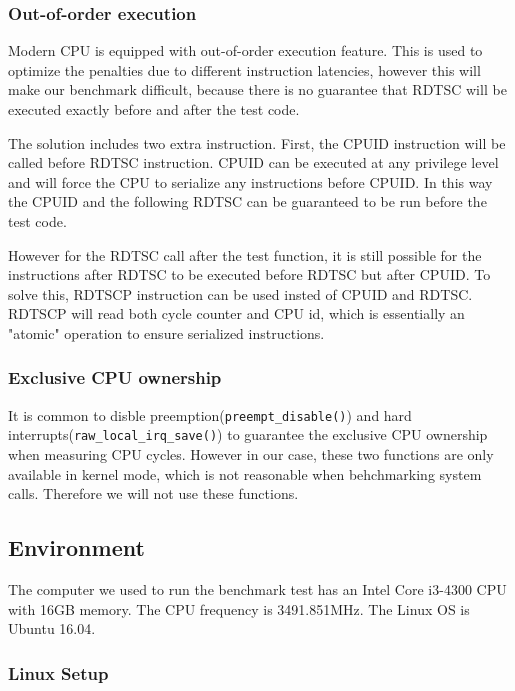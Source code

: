 \documentclass{article}
\begin{document}
\subsubsection{Out-of-order execution}

Modern CPU is equipped with out-of-order execution feature.
This is used to optimize the penalties due to different instruction latencies,
however this will make our benchmark difficult, because there is no guarantee that
RDTSC will be executed exactly before and after the test code.

The solution includes two extra instruction. First, the CPUID instruction will be called before RDTSC
instruction. CPUID can be executed at any privilege level and will force the CPU to serialize any instructions
before CPUID. In this way the CPUID and the following RDTSC can be guaranteed to be run before the test code.

However for the RDTSC call after the test function,
it is still possible for the instructions after RDTSC to be executed before RDTSC but after CPUID.
To solve this, RDTSCP instruction can be used insted of CPUID and RDTSC.
RDTSCP will read both cycle counter and CPU id, which is essentially an "atomic" operation
to ensure serialized instructions.

\subsubsection{Exclusive CPU ownership}

It is common to disble preemption(\lstinline{preempt_disable()}) and hard interrupts(\lstinline{raw_local_irq_save()})
to guarantee the exclusive CPU ownership when measuring CPU cycles. However in our case, these two functions
are only available in kernel mode, which is not reasonable when behchmarking system calls.
Therefore we will not use these functions.

\subsection{Environment}

The computer we used to run the benchmark test has an Intel Core i3-4300 CPU with 16GB memory. The CPU frequency is 3491.851MHz. The Linux OS is Ubuntu 16.04.

\subsubsection{Linux Setup}
\end{document}
